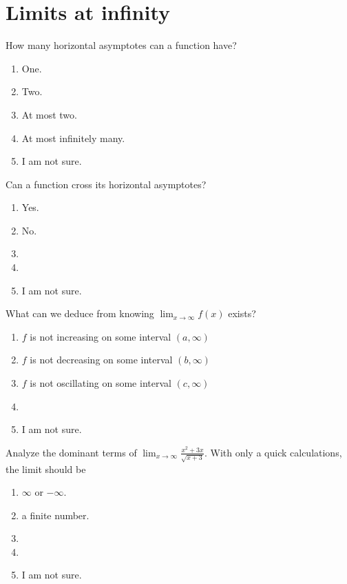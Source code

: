 \documentclass[14pt]{beamer}
\begin{document}
\section{Limits at infinity}
\begin{frame}
  How many horizontal asymptotes can a function have?

  \medskip
  \begin{enumerate} 
    \item One.
    \item Two.
    \item At most two.
    \item At most infinitely many.
    \item I am not sure.
  \end{enumerate} 
\end{frame}


\begin{frame}
  Can a function cross its horizontal asymptotes?

  \medskip
  \begin{enumerate} 
    \item Yes.
    \item No.
    \item 
    \item 
    \item I am not sure.
  \end{enumerate} 
\end{frame}


\begin{frame}
  What can we deduce from knowing \(\lim_{x \to \infty} f(x)\) exists? 

  \medskip
  \begin{enumerate} 
    \item \(f\) is not increasing on some interval \((a, \infty)\)
    \item \(f\) is not decreasing on some interval \((b, \infty)\)
    \item \(f\) is not oscillating on some interval \((c, \infty)\)
    \item 
    \item I am not sure.
  \end{enumerate} 
\end{frame}


\begin{frame}
  Analyze the dominant terms of \(\lim_{x \to \infty} \frac{x^{2}+3x}{\sqrt{x+3}}\). With only a quick calculations, the limit should be

  \medskip
  \begin{enumerate} 
    \item \(\infty\) or \(-\infty\).
    \item a finite number.
    \item 
    \item 
    \item I am not sure.
  \end{enumerate} 
\end{frame}
\end{document}
